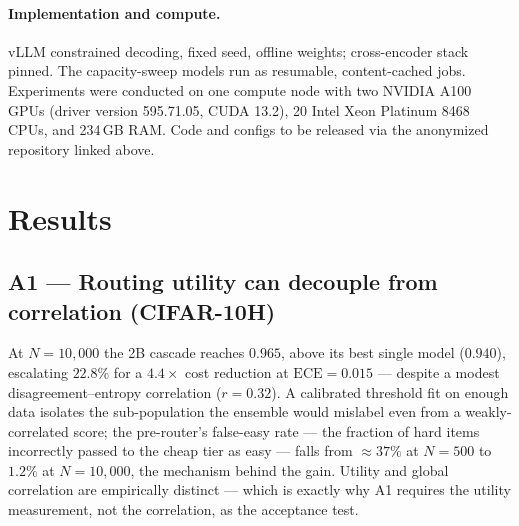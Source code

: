 \documentclass[letterpaper]{article} %
\begin{document}
\paragraph{Implementation and compute.}
vLLM constrained decoding, fixed seed, offline weights; cross-encoder stack pinned.
The capacity-sweep models run as resumable, content-cached jobs. Experiments were
conducted on one compute node with two NVIDIA A100 GPUs (driver version
595.71.05, CUDA 13.2), 20 Intel Xeon Platinum 8468 CPUs, and 234\,GB RAM. Code and
configs to be released via the anonymized repository linked above.

\section{Results}

\subsection{A1 --- Routing utility can decouple from correlation (CIFAR-10H)}
At $N{=}10{,}000$ the 2B cascade reaches $0.965$, above its best single model
($0.940$), escalating $22.8\%$ for a $4.4\times$ cost reduction at
$\mathrm{ECE}{=}0.015$ --- despite a modest disagreement--entropy correlation
($r{=}0.32$). A calibrated threshold fit on enough data isolates the
sub-population the ensemble would mislabel even from a weakly-correlated score; the
pre-router's false-easy rate --- the fraction of hard items incorrectly passed to the cheap tier as easy --- falls from ${\approx}37\%$ at $N{=}500$ to $1.2\%$ at
$N{=}10{,}000$, the mechanism behind the gain. Utility and global correlation are
empirically distinct --- which is exactly why A1 requires the utility measurement,
not the correlation, as the acceptance test.
\end{document}
